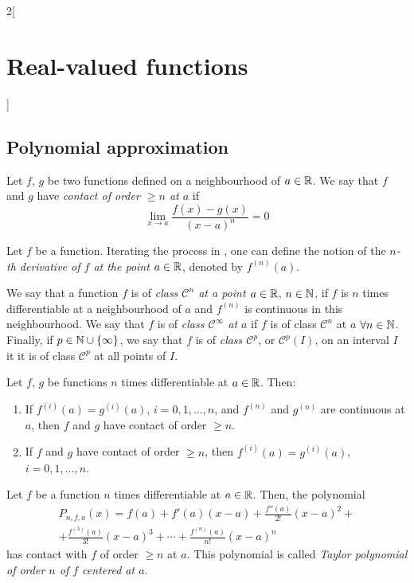 \documentclass[../../../main_math.tex]{subfiles}
\begin{document}
\begin{multicols}{2}[\section{Real-valued functions}]
  \subsection{Polynomial approximation}
  \begin{definition}
    Let $f$, $g$ be two functions defined on a neighbourhood of $a\in\mathbb{R}$.  We say that $f$ and $g$ have \emph{contact of order $\geq n$ at $a$} if $$\lim_{x\to a}\frac{f(x)-g(x)}{{(x-a)}^n}=0$$
  \end{definition}
  \begin{definition}
    Let $f$ be a function. Iterating the process in , one can define the notion of the \emph{$n$-th derivative of $f$ at the point $a\in\mathbb{R}$}, denoted by $f^{(n)}(a)$.
  \end{definition}
  \begin{definition}
    We say that a function $f$ is of \emph{class $\mathcal{C}^n$ at a point $a\in\mathbb{R}$}, $n\in\mathbb{N}$, if $f$ is $n$ times differentiable at a neighbourhood of $a$ and $f^{(n)}$ is continuous in this neighbourhood. We say that $f$ is of \emph{class $\mathcal{C}^\infty$ at $a$} if $f$ is of class $\mathcal{C}^n$ at $a$ $\forall n\in\mathbb{N}$. Finally, if $p\in\mathbb{N}\cup\{\infty\}$, we say that $f$ is of \emph{class $\mathcal{C}^p$}, or $\mathcal{C}^p(I)$, on an interval $I$ it it is of class $\mathcal{C}^p$ at all points of $I$.
  \end{definition}
  \begin{lemma}
    Let $f$, $g$ be functions $n$ times differentiable at $a\in\mathbb{R}$. Then:
    \begin{enumerate}
      \item If $f^{(i)}(a)=g^{(i)}(a)$, $i=0,1,\ldots,n$, and $f^{(n)}$ and $g^{(n)}$ are continuous at $a$, then $f$ and $g$ have contact of order $\geq n$.
      \item If $f$ and $g$ have contact of order $\geq n$, then $f^{(i)}(a)=g^{(i)}(a)$, $i=0,1,\ldots,n$.
    \end{enumerate}
  \end{lemma}
  \begin{theorem}
    Let $f$ be a function $n$ times differentiable at $a\in\mathbb{R}$. Then, the polynomial
    \begin{multline*}
      P_{n,f,a}(x)=f(a)+f'(a)(x-a)+\frac{f''(a)}{2!}{(x-a)}^2+\\+\frac{f^{(3)}(a)}{3!}{(x-a)}^3+\cdots+\frac{f^{(n)}(a)}{n!}{(x-a)}^n
    \end{multline*}
    has contact with $f$ of order $\geq n$ at $a$. This polynomial is called \emph{Taylor polynomial of order $n$ of $f$ centered at $a$}.

\end{theorem}
\end{multicols}
\end{document}
